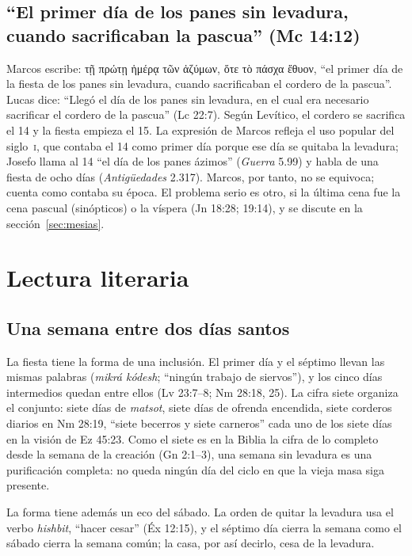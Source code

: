 \documentclass[11pt,letterpaper]{article}
\newcommand{\grc}[1]{\foreignlanguage{ancientgreek}{#1}}
\begin{document}
\subsection{``El primer día de los panes sin levadura, cuando sacrificaban la pascua'' (Mc 14:12)}
Marcos escribe: \grc{τῇ πρώτῃ ἡμέρᾳ τῶν ἀζύμων, ὅτε τὸ πάσχα ἔθυον}, ``el primer día de la fiesta de los panes sin levadura, cuando sacrificaban el cordero de la pascua''. Lucas dice: ``Llegó el día de los panes sin levadura, en el cual era necesario sacrificar el cordero de la pascua'' (Lc 22:7). Según Levítico, el cordero se sacrifica el 14 y la fiesta empieza el 15. La expresión de Marcos refleja el uso popular del siglo~\textsc{i}, que contaba el 14 como primer día porque ese día se quitaba la levadura; Josefo llama al 14 ``el día de los panes ázimos'' (\emph{Guerra} 5.99) y habla de una fiesta de ocho días (\emph{Antigüedades} 2.317). Marcos, por tanto, no se equivoca; cuenta como contaba su época. El problema serio es otro, si la última cena fue la cena pascual (sinópticos) o la víspera (Jn 18:28; 19:14), y se discute en la sección~\ref{sec:mesias}.

\section{Lectura literaria}

\subsection{Una semana entre dos días santos}
La fiesta tiene la forma de una inclusión. El primer día y el séptimo llevan las mismas palabras (\emph{mikrá kódesh}; ``ningún trabajo de siervos''), y los cinco días intermedios quedan entre ellos (Lv 23:7--8; Nm 28:18, 25). La cifra siete organiza el conjunto: siete días de \emph{matsot}, siete días de ofrenda encendida, siete corderos diarios en Nm 28:19, ``siete becerros y siete carneros'' cada uno de los siete días en la visión de Ez 45:23. Como el siete es en la Biblia la cifra de lo completo desde la semana de la creación (Gn 2:1--3), una semana sin levadura es una purificación completa: no queda ningún día del ciclo en que la vieja masa siga presente.

La forma tiene además un eco del sábado. La orden de quitar la levadura usa el verbo \emph{hishbit}, ``hacer cesar'' (Éx 12:15), y el séptimo día cierra la semana como el sábado cierra la semana común; la casa, por así decirlo, cesa de la levadura.
\end{document}
